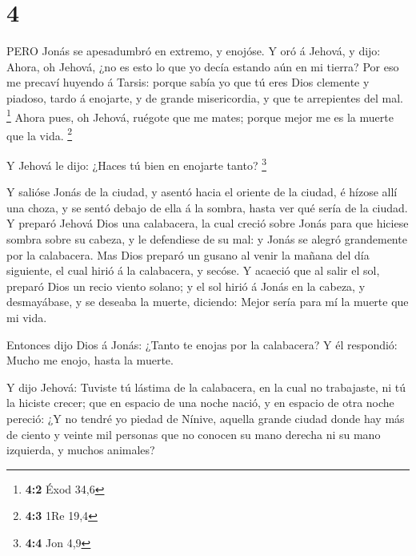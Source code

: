 \hypertarget{section-3}{%
\section{4}\label{section-3}}

 PERO Jonás se apesadumbró en extremo, y enojóse.
 Y oró á Jehová, y dijo: Ahora, oh Jehová, ¿no es esto lo
que yo decía estando aún en mi tierra? Por eso me precaví huyendo á
Tarsis: porque sabía yo que tú eres Dios clemente y piadoso, tardo á
enojarte, y de grande misericordia, y que te arrepientes del mal.
\footnote{\textbf{4:2} Éxod 34,6}  Ahora pues, oh Jehová,
ruégote que me mates; porque mejor me es la muerte que la vida.
\footnote{\textbf{4:3} 1Re 19,4}

 Y Jehová le dijo: ¿Haces tú bien en enojarte tanto?
\footnote{\textbf{4:4} Jon 4,9}

 Y salióse Jonás de la ciudad, y asentó hacia el oriente de
la ciudad, é hízose allí una choza, y se sentó debajo de ella á la
sombra, hasta ver qué sería de la ciudad.  Y preparó Jehová
Dios una calabacera, la cual creció sobre Jonás para que hiciese sombra
sobre su cabeza, y le defendiese de su mal: y Jonás se alegró
grandemente por la calabacera.  Mas Dios preparó un gusano
al venir la mañana del día siguiente, el cual hirió á la calabacera, y
secóse.  Y acaeció que al salir el sol, preparó Dios un
recio viento solano; y el sol hirió á Jonás en la cabeza, y desmayábase,
y se deseaba la muerte, diciendo: Mejor sería para mí la muerte que mi
vida.

 Entonces dijo Dios á Jonás: ¿Tanto te enojas por la
calabacera? Y él respondió: Mucho me enojo, hasta la muerte.

 Y dijo Jehová: Tuviste tú lástima de la calabacera, en la
cual no trabajaste, ni tú la hiciste crecer; que en espacio de una noche
nació, y en espacio de otra noche pereció:  ¿Y no tendré yo
piedad de Nínive, aquella grande ciudad donde hay más de ciento y veinte
mil personas que no conocen su mano derecha ni su mano izquierda, y
muchos animales?
